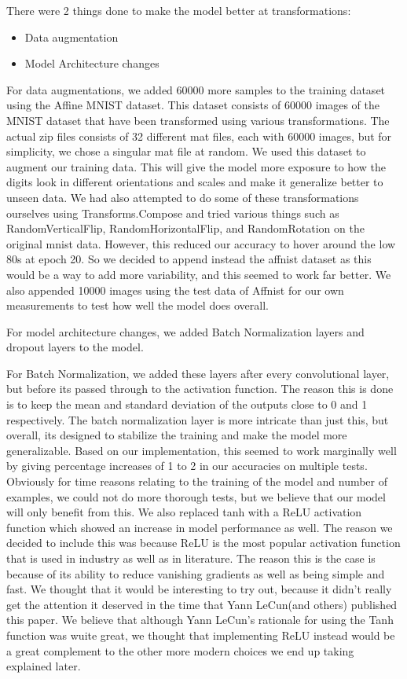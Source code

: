 \documentclass{article}
\begin{document}
There were 2 things done to make the model better at transformations:
\begin{itemize}
    \item Data augmentation
    \item Model Architecture changes
\end{itemize}

For data augmentations, we added 60000 more samples to the training dataset using the Affine MNIST dataset.
This dataset consists of 60000 images of the MNIST dataset that have been transformed using
various transformations. The actual zip files consists of 32 different mat files, each with 60000 images, but for simplicity, we chose a singular mat file at random. We used this dataset to augment our training data. This will give the 
model more exposure to how the digits look in different orientations and scales and make it 
generalize better to unseen data. We had also attempted to do some of these transformations ourselves using Transforms.Compose and tried various things such as RandomVerticalFlip, RandomHorizontalFlip, and RandomRotation on the original mnist data. However, this reduced our accuracy to hover around the low 80s at epoch 20. So we decided to append instead the affnist dataset as this would be a way to add more variability, and this seemed to work far better. We also appended 10000 images using the test data of Affnist for our own measurements to test how well the model does overall.

For model architecture changes, we added Batch Normalization layers and dropout layers to the model.

For Batch Normalization, we added these layers after every convolutional layer, but before its passed through to the activation function. The reason this is done is to keep the mean and standard deviation of the outputs close to 0 and 1 respectively. The batch normalization layer is more intricate than just this, but overall, its designed to stabilize the training and make the model more generalizable. Based on our implementation, this seemed to work marginally well by giving percentage increases of 1 to 2 in our accuracies on multiple tests. Obviously for time reasons relating to the training of the model and number of examples, we could not do more thorough tests, but we believe that our model will only benefit from this. We also replaced tanh with a ReLU activation function which showed an increase in model performance as well. The reason we decided to include this was because ReLU is the most popular activation function that is used in industry as well as in literature. The reason this is the case is because of its ability to reduce vanishing gradients as well as being simple and fast. We thought that it would be interesting to try out, because it didn't really get the attention it deserved in the time that Yann LeCun(and others) published this paper. We believe that although Yann LeCun's rationale for using the Tanh function was wuite great, we thought that implementing ReLU instead would be a great complement to the other more modern choices we end up taking explained later.
\end{document}
